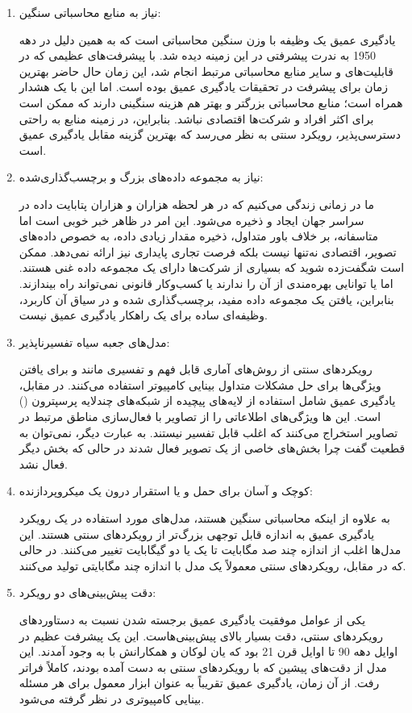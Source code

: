 \documentclass{article}
\begin{document}
\begin{enumerate}
\item نیاز به منابع محاسباتی سنگین:

یادگیری عمیق یک وظیفه با وزن سنگین محاسباتی است که به همین دلیل در دهه 1950 به ندرت پیشرفتی در این زمینه دیده شد. با پیشرفت‌های عظیمی که در قابلیت‌های  و سایر منابع محاسباتی مرتبط انجام شد، این زمان حال حاضر بهترین زمان برای پیشرفت در تحقیقات یادگیری عمیق بوده است. اما این با یک هشدار همراه است؛ منابع محاسباتی بزرگتر و بهتر هم هزینه سنگینی دارند که ممکن است برای اکثر افراد و شرکت‌ها اقتصادی نباشد. بنابراین، در زمینه منابع به راحتی دسترسی‌پذیر، رویکرد سنتی به نظر می‌رسد که بهترین گزینه مقابل یادگیری عمیق است.

\item نیاز به مجموعه داده‌های بزرگ و برچسب‌گذاری‌شده:

ما در زمانی زندگی می‌کنیم که در هر لحظه هزاران و هزاران پتابایت داده در سراسر جهان ایجاد و ذخیره می‌شود. این امر در ظاهر خبر خوبی است اما متاسفانه، بر خلاف باور متداول، ذخیره مقدار زیادی داده، به خصوص داده‌های تصویر، اقتصادی نه‌تنها نیست بلکه فرصت تجاری پایداری نیز ارائه نمی‌دهد. ممکن است شگفت‌زده شوید که بسیاری از شرکت‌ها دارای یک مجموعه داده غنی هستند. اما یا توانایی بهره‌مندی از آن را ندارند یا کسب‌وکار قانونی نمی‌تواند راه بیندازند. بنابراین، یافتن یک مجموعه داده مفید، برچسب‌گذاری شده و در سیاق آن کاربرد، وظیفه‌ای ساده برای یک راهکار یادگیری عمیق نیست.

\item مدل‌های جعبه سیاه تفسیرناپذیر:

رویکردهای سنتی از روش‌های آماری قابل فهم و تفسیری مانند  و  برای یافتن ویژگی‌ها برای حل مشکلات متداول بینایی کامپیوتر استفاده می‌کنند. در مقابل، یادگیری عمیق شامل استفاده از لایه‌های پیچیده از شبکه‌های چندلایه پرسپترون () است. این ‌ها ویژگی‌های اطلاعاتی را از تصاویر با فعال‌سازی مناطق مرتبط در تصاویر استخراج می‌کنند که اغلب قابل تفسیر نیستند. به عبارت دیگر، نمی‌توان به قطعیت گفت چرا بخش‌های خاصی از یک تصویر فعال شدند در حالی که بخش دیگر فعال نشد.

\item کوچک و آسان برای حمل و یا استقرار درون یک میکروپردازنده:

به علاوه از اینکه محاسباتی سنگین هستند، مدل‌های مورد استفاده در یک رویکرد یادگیری عمیق به اندازه قابل توجهی بزرگ‌تر از رویکردهای سنتی هستند. این مدل‌ها اغلب از اندازه چند صد مگابایت تا یک یا دو گیگابایت تغییر می‌کنند. در حالی که در مقابل، رویکردهای سنتی معمولاً یک مدل با اندازه چند مگابایتی تولید می‌کنند.

\item دقت پیش‌بینی‌های دو رویکرد:

یکی از عوامل موفقیت یادگیری عمیق برجسته شدن نسبت به دستاوردهای رویکردهای سنتی، دقت بسیار بالای پیش‌بینی‌هاست. این یک پیشرفت عظیم در اوایل دهه 90 تا اوایل قرن 21 بود که یان لوکان و همکارانش با  به وجود آمدند. این مدل از دقت‌های پیشین که با رویکردهای سنتی به دست آمده بودند، کاملاً فراتر رفت. از آن زمان، یادگیری عمیق تقریباً به عنوان ابزار معمول برای هر مسئله بینایی کامپیوتری در نظر گرفته می‌شود.

\end{enumerate}
\end{document}

